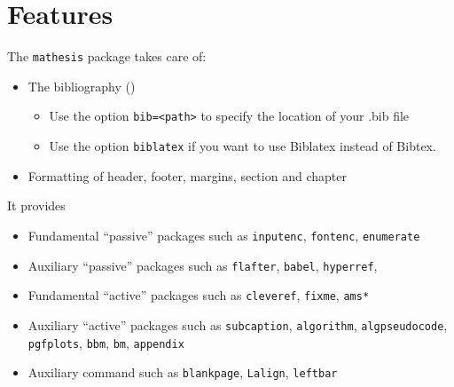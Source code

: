\section{Features}

The \verb|mathesis| package takes care of:
\begin{itemize}
	\item The bibliography (\cite{AdamsFournier2003})
	\begin{itemize}
		\item Use the option \verb|bib=<path>| to specify the location of your .bib file
		\item Use the option \verb|biblatex| if you want to use Biblatex instead of  Bibtex.
	\end{itemize}
	\item Formatting of header, footer, margins, section and chapter	
\end{itemize}
It provides
\begin{itemize}
	\item Fundamental ``passive'' packages such as \verb|inputenc|, \verb|fontenc|, \verb|enumerate|
	\item Auxiliary ``passive'' packages such as \verb|flafter|, \verb|babel|, \verb|hyperref|,
	\item Fundamental ``active'' packages such as \verb|cleveref|, \verb|fixme|, \verb|ams*|
	\item Auxiliary ``active'' packages such as \verb|subcaption|, \verb|algorithm|, \verb|algpseudocode|, \verb|pgfplots|, \verb|bbm|, \verb|bm|, \verb|appendix|
	\item Auxiliary command such as \verb|blankpage|, \verb|Lalign|, \verb|leftbar|
\end{itemize}